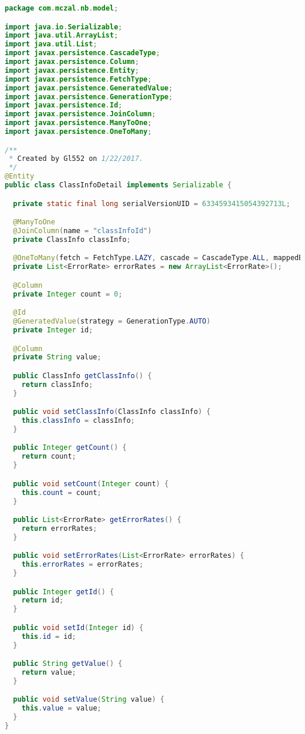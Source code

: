 \begin{lstlisting}[language=Java,basicstyle=\tiny,caption=ClassInfoDetail.java]
package com.mczal.nb.model;

import java.io.Serializable;
import java.util.ArrayList;
import java.util.List;
import javax.persistence.CascadeType;
import javax.persistence.Column;
import javax.persistence.Entity;
import javax.persistence.FetchType;
import javax.persistence.GeneratedValue;
import javax.persistence.GenerationType;
import javax.persistence.Id;
import javax.persistence.JoinColumn;
import javax.persistence.ManyToOne;
import javax.persistence.OneToMany;

/**
 * Created by Gl552 on 1/22/2017.
 */
@Entity
public class ClassInfoDetail implements Serializable {

  private static final long serialVersionUID = 6334593415054392713L;

  @ManyToOne
  @JoinColumn(name = "classInfoId")
  private ClassInfo classInfo;

  @OneToMany(fetch = FetchType.LAZY, cascade = CascadeType.ALL, mappedBy = "classInfoDetail")
  private List<ErrorRate> errorRates = new ArrayList<ErrorRate>();

  @Column
  private Integer count = 0;

  @Id
  @GeneratedValue(strategy = GenerationType.AUTO)
  private Integer id;

  @Column
  private String value;

  public ClassInfo getClassInfo() {
    return classInfo;
  }

  public void setClassInfo(ClassInfo classInfo) {
    this.classInfo = classInfo;
  }

  public Integer getCount() {
    return count;
  }

  public void setCount(Integer count) {
    this.count = count;
  }

  public List<ErrorRate> getErrorRates() {
    return errorRates;
  }

  public void setErrorRates(List<ErrorRate> errorRates) {
    this.errorRates = errorRates;
  }

  public Integer getId() {
    return id;
  }

  public void setId(Integer id) {
    this.id = id;
  }

  public String getValue() {
    return value;
  }

  public void setValue(String value) {
    this.value = value;
  }
}

\end{lstlisting}


